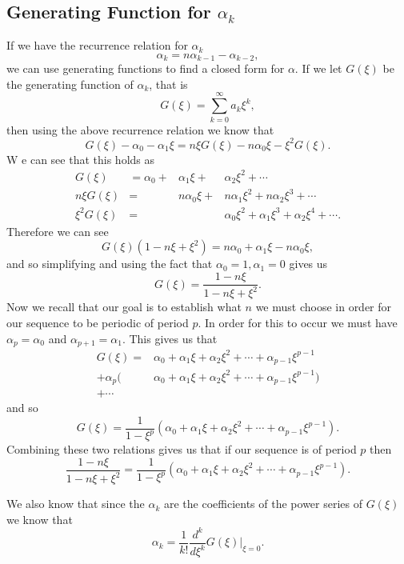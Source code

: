 \documentclass[12pt]{article}
\begin{document}
\subsection{Generating Function for $\alpha_k$}
If we have the recurrence relation for $\alpha_k$ 
\begin{equation*}
\alpha_k = n \alpha_{k-1} - \alpha_{k-2}, 
\end{equation*}
we can use generating functions to find a closed form for $\alpha$. If we let $G(\xi)$ be the generating function of $\alpha_k$, that is 
\begin{equation*}
G(\xi) = \sum_{k=0}^{\infty} a_k \xi^k,
\end{equation*}
then using the above recurrence relation we know that 
\begin{equation*}
G(\xi) -\alpha_0 - \alpha_1 \xi = n \xi G(\xi) - n \alpha_0 \xi - \xi^2 G(\xi).
\end{equation*}
W e can see that this holds as 
\begin{align*}
G(\xi) &= \alpha_0 + &\alpha_1 \xi + &\alpha_2 \xi^2 + \cdots \\
n \xi G(\xi) &= &n\alpha_0 \xi + &n\alpha_1 \xi^2 + n\alpha_2 \xi^3 + \cdots \\
\xi^2 G(\xi) &= &&\alpha_0 \xi^2 + \alpha_1 \xi^3 + \alpha_2 \xi^4 + \cdots.
\end{align*}
Therefore we can see 
\begin{equation*}
G( \xi) (1-n \xi + \xi^2) = n\alpha_0 + \alpha_1 \xi - n\alpha_0 \xi,
\end{equation*}
and so simplifying and using the fact that $\alpha_0=1, \alpha_1=0$ gives us 
\begin{equation*}
G(\xi) = \frac{ 1 - n\xi}{1 - n \xi + \xi^2} .
\end{equation*}
Now we recall that our goal is to establish what $n$ we must choose in order for our sequence to be periodic of period $p$. In order for this to occur we must have $\alpha_p= \alpha_0$ and $\alpha_{p+1} = \alpha_1$. This gives us that 
\begin{align*}
G(\xi) = &\alpha_0 + \alpha_1 \xi + \alpha_2 \xi^2 + \cdots + \alpha_{p-1} \xi^{p-1} \\
+ \alpha_p(&\alpha_0 + \alpha_1 \xi + \alpha_2 \xi^2 + \cdots + \alpha_{p-1} \xi^{p-1}) \\ 
+ \cdots 
\end{align*}
and so 
\begin{equation*}
G(\xi) = \frac{1}{1- \xi^p} (\alpha_0 + \alpha_1 \xi + \alpha_2 \xi^2 + \cdots + \alpha_{p-1} \xi^{p-1}).
\end{equation*}
Combining these two relations gives us that if our sequence is of period $p$ then 
\begin{equation*}
\frac{ 1 - n\xi}{1 - n \xi + \xi^2} = \frac{1}{1- \xi^p} (\alpha_0 + \alpha_1 \xi + \alpha_2 \xi^2 + \cdots + \alpha_{p-1} \xi^{p-1}).
\end{equation*}

We also know that since the $\alpha_k$ are the coefficients of the power series of $G(\xi)$ we know that 
\begin{equation*}
\alpha_k = \frac{1}{k!} \frac{d^k}{d \xi^k} G(\xi) |_{\xi=0}.
\end{equation*}
\end{document}
